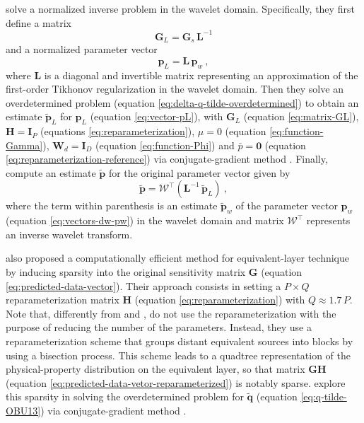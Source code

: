 \documentclass[utf8]{FrontiersinHarvard} %
\begin{document}
	\citet{li-oldenburg2010} solve a normalized inverse problem in the wavelet domain.
	Specifically, they first define a matrix
	\begin{equation}
		\mathbf{G}_{L} = \mathbf{G}_{s} \, \mathbf{L}^{-1}
		\label{eq:matrix-GL}
	\end{equation}
	and a normalized parameter vector 
	\begin{equation}
		\mathbf{p}_{L} = \mathbf{L} \, \mathbf{p}_{w} \: ,
		\label{eq:vector-pL}
	\end{equation}
	where $\mathbf{L}$ is a diagonal and invertible matrix representing an approximation of the 
	first-order Tikhonov regularization in the wavelet domain.
	Then they solve an overdetermined problem (equation \ref{eq:delta-q-tilde-overdetermined}) 
	to obtain an estimate $\tilde{\mathbf{p}}_{L}$ for $\mathbf{p}_{L}$ (equation \ref{eq:vector-pL}), 
	with $\mathbf{G}_{L}$ (equation \ref{eq:matrix-GL}), 
	$\mathbf{H} = \mathbf{I}_{P}$ (equations \ref{eq:reparameterization}),
	$\mu = 0$ (equation \ref{eq:function-Gamma}), 
	$\mathbf{W}_{d} = \mathbf{I}_{D}$ (equation \ref{eq:function-Phi}) and 
	$\bar{p} = \mathbf{0}$ (equation \ref{eq:reparameterization-reference}) via 
	conjugate-gradient method \cite[e.g.,][sec. 11.3]{golub-vanloan2013}.
	Finally, \citet{li-oldenburg2010} compute an estimate $\tilde{\mathbf{p}}$ for the original parameter vector given by
	\begin{equation}
		\tilde{\mathbf{p}} = \boldsymbol{\mathcal{W}}^{\top} \left( \mathbf{L}^{-1} \, \tilde{\mathbf{p}}_{L} \right) \: ,
		\label{eq:vector-p-tilde-LO10}
	\end{equation}
	where the term within parenthesis is an estimate $\tilde{\mathbf{p}}_{w}$ of the parameter vector $\mathbf{p}_{w}$
	(equation \ref{eq:vectors-dw-pw}) in the wavelet domain and 
	matrix $\boldsymbol{\mathcal{W}}^{\top}$ represents an inverse wavelet transform. 
	
	\citet{barnes-lumley2011} also proposed a computationally efficient method for equivalent-layer technique 
	by inducing sparsity into the original sensitivity matrix $\mathbf{G}$ (equation \ref{eq:predicted-data-vector}). 
	Their approach consists in setting a $P \times Q$ reparameterization matrix $\mathbf{H}$
	(equation \ref{eq:reparameterization}) with $Q \approx 1.7 \, P$.
	Note that, differently from \citet{oliveirajr-etal2013} and \citet{mendonca2020}, \citet{barnes-lumley2011}
	do not use the reparameterization with the purpose of reducing the number of the parameters.
	Instead, they use a reparameterization scheme that groups distant equivalent sources into blocks by
	using a bisection process. 
	This scheme leads to a quadtree representation of the physical-property distribution on the equivalent layer, 
	so that matrix $\mathbf{G}\mathbf{H}$ (equation \ref{eq:predicted-data-vetor-reparameterized}) is notably sparse.
	\cite{barnes-lumley2011} explore this sparsity in solving the overdetermined problem for $\tilde{\mathbf{q}}$
	(equation \ref{eq:q-tilde-OBU13}) via conjugate-gradient method \cite[e.g.,][sec. 11.3]{golub-vanloan2013}.
	
\end{document}
